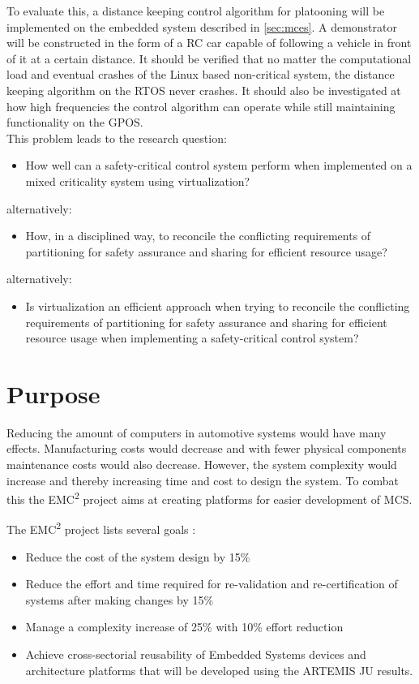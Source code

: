 To evaluate this, a distance keeping control algorithm for platooning will be implemented on the embedded system described in \ref{sec:mces}. A demonstrator will be constructed in the form of a RC car capable of following a vehicle in front of it at a certain distance. It should be verified that no matter the computational load and eventual crashes of the Linux based non-critical system, the distance keeping algorithm on the RTOS never crashes. It should also be investigated at how high frequencies the control algorithm can operate while still maintaining functionality on the GPOS.\\

This problem leads to the research question: 
\begin{itemize}
\item How well can a safety-critical control system perform when implemented on a mixed criticality system using virtualization?
\end{itemize}
alternatively:
\begin{itemize}
\item How, in a disciplined way, to reconcile the conflicting requirements of partitioning for safety assurance and sharing for efficient resource usage? \cite{burns2016}
\end{itemize}
alternatively:
\begin{itemize}
\item Is virtualization an efficient approach when trying to reconcile the conflicting requirements of partitioning for safety assurance and sharing for efficient resource usage when implementing a safety-critical control system?
\end{itemize}

\section{Purpose}
Reducing the amount of computers in automotive systems would have many effects. Manufacturing costs would decrease and with fewer physical components maintenance costs would also decrease. However, the system complexity would increase and thereby increasing time and cost to design the system. To combat this the EMC\textsuperscript{2} project aims at creating platforms for easier development of MCS. %

The EMC\textsuperscript{2} project lists several goals \cite{website:emc2goals}:
\begin{itemize}
\item Reduce the cost of the system design by 15\%
\item Reduce the effort and time required for re-validation and re-certification of systems after making changes by 15\%
\item Manage a complexity increase of 25\% with 10\% effort reduction
\item Achieve cross-sectorial reusability of Embedded Systems devices and architecture platforms that will be developed using the ARTEMIS JU results.
\end{itemize}

